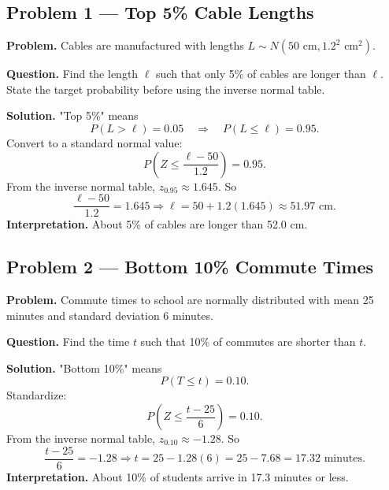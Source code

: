	\begin{ExamProblems}
		
		\hypertarget{c7-ex1}{}
		\item
		\subsection*{Problem 1 — Top 5\% Cable Lengths}
		
		\textbf{Problem.}
		Cables are manufactured with lengths \(L\sim N(50\text{ cm}, 1.2^2\text{ cm}^2)\).
		
		\textbf{Question.} Find the length \(\ell\) such that only 5\% of cables are longer than \(\ell\).
		State the target probability before using the inverse normal table.
		
		\textbf{Solution.}
		"Top 5\%" means
		\[
		P(L>\ell)=0.05\quad\Rightarrow\quad P(L\le \ell)=0.95.
		\]
		Convert to a standard normal value:
		\[
		P\left(Z\le \frac{\ell-50}{1.2}\right)=0.95.
		\]
		From the inverse normal table, \(z_{0.95}\approx 1.645\).
		So
		\[
		\frac{\ell-50}{1.2}=1.645\Rightarrow \ell=50+1.2(1.645)\approx 51.97\text{ cm}.
		\]
		\textbf{Interpretation.} About 5\% of cables are longer than 52.0 cm.
		
		
		\hypertarget{c7-ex2}{}
		\item
		\subsection*{Problem 2 — Bottom 10\% Commute Times}
		
		\textbf{Problem.}
		Commute times to school are normally distributed with mean 25 minutes and
		standard deviation 6 minutes.
		
		\textbf{Question.} Find the time \(t\) such that 10\% of commutes are shorter than \(t\).
		
		\textbf{Solution.}
		"Bottom 10\%" means
		\[
		P(T\le t)=0.10.
		\]
		Standardize:
		\[
		P\left(Z\le \frac{t-25}{6}\right)=0.10.
		\]
		From the inverse normal table, \(z_{0.10}\approx -1.28\).
		So
		\[
		\frac{t-25}{6}=-1.28\Rightarrow t=25-1.28(6)=25-7.68=17.32\text{ minutes}.
		\]
		\textbf{Interpretation.} About 10\% of students arrive in 17.3 minutes or less.
		
	\end{ExamProblems}
	
	
